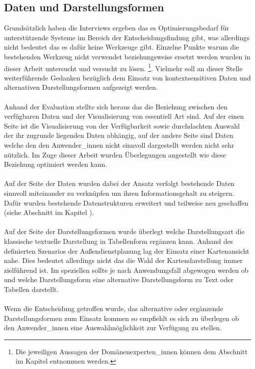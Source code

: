 \documentclass[Bachelorarbeit.tex]{subfiles}
\begin{document}
\subsection*{Daten und Darstellungsformen}
Grundsätzlich haben die Interviews ergeben das es Optimierungsbedarf für unterstützende Systeme im Bereich der Entscheidungsfindung gibt, was allerdings nicht bedeutet das es dafür keine Werkzeuge gibt.
Einzelne Punkte warum die bestehenden Werkzeug nicht verwendet beziehungsweise ersetzt werden wurden in dieser Arbeit untersucht und versucht zu lösen.
\footnote{Die jeweiligen Aussagen der Domänenexperten\_innen können dem Abschnitt  im Kapitel  entnommen werden.}.
Vielmehr soll an dieser Stelle weiterführende Gedanken bezüglich dem Einsatz von kontextsensitiven Daten und alternativen Darstellungsformen aufgezeigt werden.\\
\\
Anhand der Evaluation stellte sich heraus das die Beziehung zwischen den verfügbaren Daten und der Visualisierung von essentiell Art sind.
Auf der einen Seite ist die Visualisierung von der Verfügbarkeit sowie durchdachten Auswahl der ihr zugrunde liegenden Daten abhängig, auf der andere Seite sind Daten welche den den Anwender\_innen nicht sinnvoll dargestellt werden nicht sehr nützlich. 
Im Zuge dieser Arbeit wurden Überlegungen angestellt wie diese Beziehung optimiert werden kann. \\
\\
Auf der Seite der Daten wurden dabei der Ansatz verfolgt bestehende Daten sinnvoll miteinander zu verknüpfen um ihren Informationsgehalt zu steigern. 
Dafür wurden bestehende Datenstrukturen erweitert und teilweise neu geschaffen (siehe Abschnitt  im Kapitel ).\\
\\
Auf der Seite der Darstellungsformen wurde überlegt welche Darstellungsart die klassische textuelle Darstellung in Tabellenform ergänzen kann.
Anhand des definierten Szenarios der Außendienstplanung lag der Einsatz einer Kartenansicht nahe.
Dies bedeutet allerdings nicht das die Wahl der Kartendarstellung immer zielführend ist. 
Im speziellen sollte je nach Anwendungsfall abgewogen werden ob und welche Darstellungsform eine alternative Darstellungsform zu Text oder Tabellen darstellt.\\
\\
Wenn die Entscheidung getroffen wurde, das alternative oder ergänzende Darstellungsformen zum Einsatz kommen so empfiehlt es sich zu überlegen ob den Anwender\_innen eine Auswahlmöglichkeit zur Verfügung zu stellen. 
\end{document}
